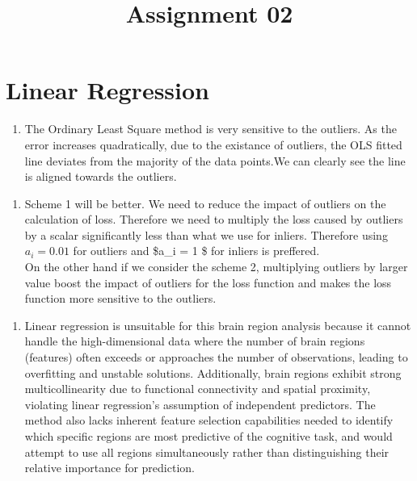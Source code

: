 \documentclass[11pt]{article}
\title{Assignment 02}
\providecommand{\tightlist}{%
      \setlength{\itemsep}{0pt}\setlength{\parskip}{0pt}}
\begin{document}
    
    \maketitle
    
    

    
    \section{Linear Regression}\label{linear-regression}

    \begin{enumerate}
\def\labelenumi{\arabic{enumi}.}
\tightlist
\item
  The Ordinary Least Square method is very sensitive to the outliers. As
  the error increases quadratically, due to the existance of outliers,
  the OLS fitted line deviates from the majority of the data points.We
  can clearly see the line is aligned towards the outliers.
\end{enumerate}

    \begin{enumerate}
\def\labelenumi{\arabic{enumi}.}
\setcounter{enumi}{1}
\tightlist
\item
  Scheme 1 will be better. We need to reduce the impact of outliers on
  the calculation of loss. Therefore we need to multiply the loss caused
  by outliers by a scalar significantly less than what we use for
  inliers. Therefore using \(a_i=0.01\) for outliers and \$a\_i = 1 \$
  for inliers is preffered.\\
  On the other hand if we consider the scheme 2, multiplying outliers by
  larger value boost the impact of outliers for the loss function and
  makes the loss function more sensitive to the outliers.
\end{enumerate}

    \begin{enumerate}
\def\labelenumi{\arabic{enumi}.}
\setcounter{enumi}{2}
\tightlist
\item
  Linear regression is unsuitable for this brain region analysis because
  it cannot handle the high-dimensional data where the number of brain
  regions (features) often exceeds or approaches the number of
  observations, leading to overfitting and unstable solutions.
  Additionally, brain regions exhibit strong multicollinearity due to
  functional connectivity and spatial proximity, violating linear
  regression's assumption of independent predictors. The method also
  lacks inherent feature selection capabilities needed to identify which
  specific regions are most predictive of the cognitive task, and would
  attempt to use all regions simultaneously rather than distinguishing
  their relative importance for prediction.
\end{enumerate}
\end{document}
